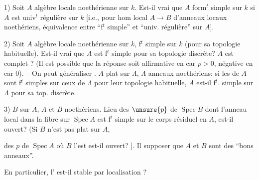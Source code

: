 1) Soit $A$ algèbre locale noethérienne sur $k$. Est-il vrai
que $A$ form$^t$ simple sur $k$ si $A$ est univ$^t$ régulière
sur $k$ [i.e., pour hom local $A\longrightarrow B$ d'anneaux
locaux noethériens, équivalence entre ``f$^t$ simple''
et ``univ. régulière''  sur $A$].


2) Soit $A$ algèbre locale noethérienne sur $k$, f$^t$
simple sur $k$ (pour sa topologie habituelle).
Est-il vrai que $A$ est f$^t$ simple pour sa topologie
discrète?  $A$ est complet ? (Il est
possible que la réponse soit affirmative en
car $p>0$, négative en car 0). -- On peut
généraliser . $A$ plat sur $\Lambda$,
 $\Lambda$ anneaux noethériens: si les
 de $A$ sont f$^t$ simples sur ceux de $\Lambda$
pour leur topologie habituelle, $A$ est-il f$^t$.
simple sur $\Lambda$ pour sa top. discrète.


3) $B$   sur $A$, $A$ et $B$ noethériens.
Lieu des $\unsure{p}$ de $\operatorname{Spec}B$ dont l'anneau
local dans la fibre sur $\operatorname{Spec}A$ est f$^t$ simple
sur le corps résiduel en $A$, est-il ouvert?
\deleted{[NB. \unsure{Même}} (Si $B$ n'est pas plat sur $A$,



 des $p$ de $\operatorname{Spec}A$ où $B$ l'est est-il
ouvert? ]. Il  supposer que $A$ et $B$
sont des ``bons anneaux''.

En particulier, l' est-il
stable par localisation ?

